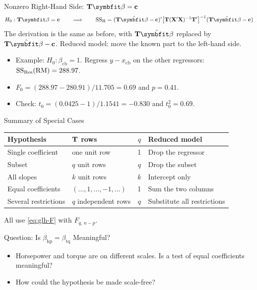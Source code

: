 \begin{frame}{Nonzero Right-Hand Side: $\bT\bbeta=\mathbf{c}$}
    \[
    H_0:\bT\bbeta=\mathbf{c}
    \qquad\Longrightarrow\qquad
    \SSH=(\bT\hat{\bbeta}-\mathbf{c})'\bigl[\bT(\bX'\bX)^{-1}\bT'\bigr]^{-1}(\bT\hat{\bbeta}-\mathbf{c})
    \]
    The derivation is the same as before, with $\bT\hat{\bbeta}$ replaced by $\bT\hat{\bbeta}-\mathbf{c}$. Reduced model: move the known part to the left-hand side.
    \begin{itemize}
        \item Example: $H_0:\beta_{\mathrm{cb}}=1$. Regress $y-x_{\mathrm{cb}}$ on the other regressors: $\mathrm{SS}_{\mathrm{Res}}(\mathrm{RM})=288.97$.
        \item $F_0=(288.97-280.91)/11.705=0.69$ and $p=0.41$.
        \item Check: $t_0=(0.0425-1)/1.1541=-0.830$ and $t_0^2=0.69$.
    \end{itemize}
\end{frame}


\begin{frame}{Summary of Special Cases}
    \begin{center}
        \small
        \begin{tabular}{llcl}
            \toprule
            Hypothesis & $\mathbf{T}$ rows & $q$ & Reduced model \\
            \midrule
            Single coefficient & one unit row & 1 & Drop the regressor \\
            Subset & $q$ unit rows & $q$ & Drop the subset \\
            All slopes & $k$ unit rows & $k$ & Intercept only \\
            Equal coefficients & $(\dots,1,\dots,-1,\dots)$ & 1 & Sum the two columns \\
            Several restrictions & $q$ independent rows & $q$ & Substitute all restrictions \\
            \bottomrule
        \end{tabular}
    \end{center}
    All use \eqref{eq:glh-F} with $F_{q,\,n-p}$.
\end{frame}


\begin{frame}{Question: Is $\beta_{\mathrm{hp}}=\beta_{\mathrm{tq}}$ Meaningful?}
    \begin{itemize}
        \item Horsepower and torque are on different scales. Is a test of equal coefficients meaningful?
        \item How could the hypothesis be made scale-free?
    \end{itemize}
\end{frame}


